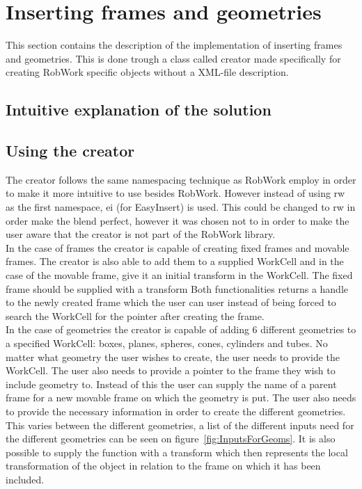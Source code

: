 \section{Inserting frames and geometries}
This section contains the description of the implementation of inserting frames and geometries. This is done trough a class called creator made specifically for creating RobWork specific objects without a XML-file description.

\subsection{Intuitive explanation of the solution}

\subsection{Using the creator}
The creator follows the same namespacing technique as RobWork employ in order to make it more intuitive to use besides RobWork. However instead of using rw as the first namespace, ei (for EasyInsert) is used. This could be changed to rw in order make the blend perfect, however it was chosen not to in order to make the user aware that the creator is not part of the RobWork library.\\

In the case of frames the creator is capable of creating fixed frames and movable frames. The creator is also able to add them to a supplied WorkCell and in the case of the movable frame, give it an initial transform in the WorkCell. The fixed frame should be supplied with a transform 
Both functionalities returns a handle to the newly created frame which the user can user instead of being forced to search the WorkCell for the pointer after creating the frame.\\

In the case of geometries the creator is capable of adding 6 different geometries to a specified WorkCell: boxes, planes, spheres, cones, cylinders and tubes. No matter what geometry the user wishes to create, the user needs to provide the WorkCell. The user also needs to provide a pointer to the frame they wish to include geometry to. Instead of this the user can supply the name of a parent frame for a new movable frame on which the geometry is put. The user also needs to provide the necessary information in order to create the different geometries. This varies between the different geometries, a list of the different inputs need for the different geometries can be seen on figure~\ref{fig:InputsForGeoms}. It is also possible to supply the function with a transform which then represents the local transformation of the object in relation to the frame on which it has been included.\\

